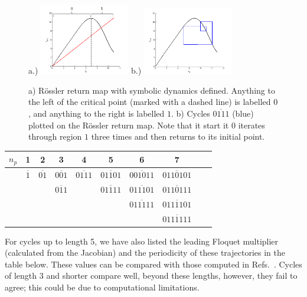 \documentclass[12 pt]{article}
\begin{document}
\begin{figure}[h]
\centering
a.)  \includegraphics[width=0.35\textwidth]{Figs/Section4/kcdemon.png}
b.)  \includegraphics[width=0.35\textwidth]{Figs/Section4/kccycle4ross.png}
\caption{
a) R\"ossler return map with symbolic dynamics defined.  Anything to the
left of the critical point (marked with a dashed line) is labelled $0$,
and anything to the right is labelled $1$.
b) Cycles $\overline{0111}$ (blue) plotted on the R\"ossler return map.
Note that it start it $0$ iterates through region $1$ three times and
then returns to its initial point.}
 \label{fig:Ross4cycle}
\end{figure}

\begin{center}
  \begin{tabular}{| l | c | c | c | c | c | c | c | c | r| }
    \hline
    $n_p$ & 1 & 2 & 3 & 4 & 5 & 6 & 7\\ \hline
    & $\overline{1}$ & $\overline{01}$ & $\overline{001}$ & $\overline{0111}$ & $\overline{01101}$ & $\overline{001011}$ & $\overline{0110101}$ \\
    &  &   & $\overline{011}$ &  & $\overline{01111}$ & $\overline{011101}$ & $\overline{0110111}$ \\
    &  &  &  &  &  & $\overline{011111}$ & $\overline{0111101}$ \\
    &  &  &  &  &  &  & $\overline{0111111}$ \\
    \hline
  \end{tabular}
\end{center}

For cycles up to length 5, we have also listed the leading Floquet
multiplier (calculated from the Jacobian) and the periodicity of these
trajectories in the table below.  These values can be compared with those
computed in Refs.~\cite{CB,OtherRoss}.  Cycles of length $3$
and shorter compare well, beyond these lengths, however, they fail to
agree; this could be due to computational limitations.
\end{document}
